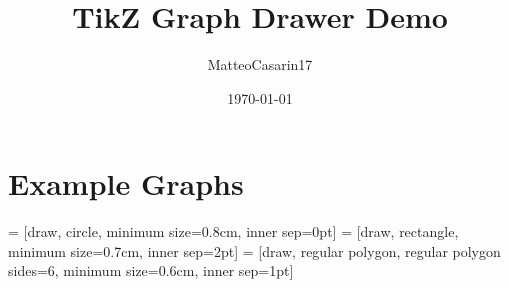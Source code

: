 \documentclass{article}
\title{\textbf{TikZ Graph Drawer Demo}}
\author{MatteoCasarin17}
\date{\today}
\begin{document}
    
    \maketitle
    
    \section*{Example Graphs}
    
     = [draw, circle, minimum size=0.8cm, inner sep=0pt]
     = [draw, rectangle, minimum size=0.7cm, inner sep=2pt]
     = [draw, regular polygon, regular polygon sides=6, minimum size=0.6cm, inner sep=1pt]
\end{document}
